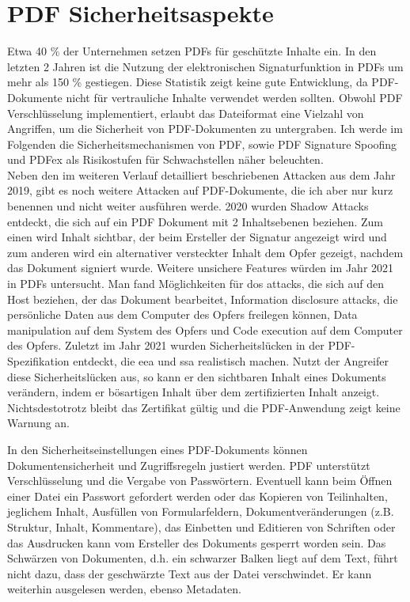 \section{PDF Sicherheitsaspekte}
Etwa 40 \% der Unternehmen setzen PDFs für geschützte Inhalte ein. In den letzten 2 Jahren ist die Nutzung der elektronischen Signaturfunktion in PDFs um mehr als 150 \% gestiegen. \cite{formilo} Diese Statistik zeigt keine gute Entwicklung, da PDF-Dokumente nicht für vertrauliche Inhalte verwendet werden sollten. Obwohl PDF Verschlüsselung implementiert, erlaubt das Dateiformat eine Vielzahl von Angriffen, um die Sicherheit von PDF-Dokumenten zu untergraben. Ich werde im Folgenden die Sicherheitsmechanismen von PDF, sowie PDF Signature Spoofing und PDFex als Risikostufen für Schwachstellen näher beleuchten. \\ Neben den im weiteren Verlauf detailliert beschriebenen Attacken aus dem Jahr 2019, gibt es noch weitere Attacken auf PDF-Dokumente, die ich aber nur kurz benennen und nicht weiter ausführen werde. 2020 wurden Shadow Attacks entdeckt, die sich auf ein PDF Dokument mit 2 Inhaltsebenen beziehen. Zum einen wird Inhalt sichtbar, der beim Ersteller der Signatur angezeigt wird und zum anderen wird ein alternativer versteckter Inhalt dem Opfer gezeigt, nachdem das Dokument signiert wurde. Weitere unsichere Features würden im Jahr 2021 in PDFs untersucht. Man fand Möglichkeiten für \gls{dos} attacks, die sich auf den Host beziehen, der das Dokument bearbeitet, Information disclosure attacks, die persönliche Daten aus dem Computer des Opfers freilegen können, Data manipulation auf dem System des Opfers und Code execution auf dem Computer des Opfers. Zuletzt im Jahr 2021 wurden Sicherheitslücken in der PDF-Spezifikation entdeckt, die \gls{eea} und \gls{ssa} realistisch machen. Nutzt der Angreifer diese Sicherheitslücken aus, so kann er den sichtbaren Inhalt eines Dokuments verändern, indem er bösartigen Inhalt über dem zertifizierten Inhalt anzeigt. Nichtsdestotrotz bleibt das Zertifikat gültig und die PDF-Anwendung zeigt keine Warnung an. \cite{pdf-insec}
\par
In den Sicherheitseinstellungen eines PDF-Dokuments können Dokumentensicherheit und Zugriffsregeln justiert werden. PDF unterstützt Verschlüsselung und die Vergabe von Passwörtern. Eventuell kann beim Öffnen einer Datei ein Passwort gefordert werden oder das Kopieren von Teilinhalten, jeglichem Inhalt, Ausfüllen von Formularfeldern, Dokumentveränderungen (z.B. Struktur, Inhalt, Kommentare), das Einbetten und Editieren von Schriften oder das Ausdrucken kann vom Ersteller des Dokuments gesperrt worden sein. Das Schwärzen von Dokumenten, d.h. ein schwarzer Balken liegt auf dem Text, führt nicht dazu, dass der geschwärzte Text aus der Datei verschwindet. Er kann weiterhin ausgelesen werden, ebenso Metadaten. 
\cite{adobe-pdf-pades}

